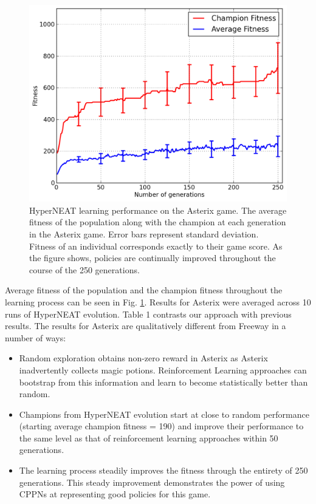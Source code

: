 \documentclass{acm_proc_article-sp}
\begin{document}
\begin{figure}[ht]
\begin{center}
\includegraphics[width=\columnwidth]{figures/asterix-results.png}
\end{center}
\caption{HyperNEAT learning performance on the Asterix game. The average fitness of the population along with the champion at each generation in the Asterix game. Error bars represent standard deviation. Fitness of an individual corresponds exactly to their game score. As the figure shows, policies are continually improved throughout the course of the 250 generations.}
\label{fig:asterix-curve}
\end{figure}

Average fitness of the population and the champion fitness throughout the learning process can be seen in Fig. \ref{fig:asterix-curve}. Results for Asterix were averaged across 10 runs of HyperNEAT evolution. Table 1 contrasts our approach with previous results. The results for Asterix are qualitatively different from Freeway in a number of ways:
\begin{itemize}
\item
Random exploration obtains non-zero reward in Asterix as Asterix inadvertently collects magic potions. Reinforcement Learning approaches can bootstrap from this information and learn to become statistically better than random.
\item
Champions from HyperNEAT evolution start at close to random performance (starting average champion fitness = 190) and improve their performance to the same level as that of reinforcement learning approaches within 50 generations. 
\item
The learning process steadily improves the fitness through the entirety of 250 generations. This steady improvement demonstrates the power of using CPPNs at representing good policies for this game.
\end{itemize}
\end{document}
